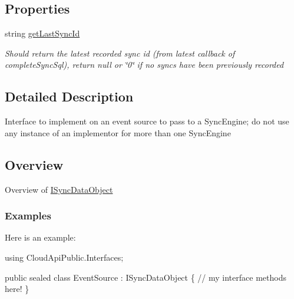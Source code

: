 \subsection*{Properties}
\begin{DoxyCompactItemize}
\item 
string \hyperlink{interface_cloud_api_public_1_1_interfaces_1_1_i_sync_data_object_a1e0e4f15f93fce38eb008953eb1dd477}{get\-Last\-Sync\-Id}
\begin{DoxyCompactList}\small\item\em Should return the latest recorded sync id (from latest callback of complete\-Sync\-Sql), return null or \char`\"{}0\char`\"{} if no syncs have been previously recorded \end{DoxyCompactList}\end{DoxyCompactItemize}


\subsection{Detailed Description}
Interface to implement on an event source to pass to a Sync\-Engine; do not use any instance of an implementor for more than one Sync\-Engine 

\hypertarget{interface_cloud_api_public_1_1_interfaces_1_1_i_sync_data_object_sec}{}\subsection{Overview}\label{interface_cloud_api_public_1_1_interfaces_1_1_i_sync_data_object_sec}
Overview of \hyperlink{interface_cloud_api_public_1_1_interfaces_1_1_i_sync_data_object}{I\-Sync\-Data\-Object}\hypertarget{interface_cloud_api_public_1_1_interfaces_1_1_i_sync_data_object_subSec1}{}\subsubsection{Examples}\label{interface_cloud_api_public_1_1_interfaces_1_1_i_sync_data_object_subSec1}
Here is an example\-:


\begin{DoxyCode}
\textcolor{keyword}{using} CloudApiPublic.Interfaces;

\textcolor{keyword}{public} sealed \textcolor{keyword}{class }EventSource : ISyncDataObject
\{
    \textcolor{comment}{// my interface methods here!}
\}
\end{DoxyCode}
 

